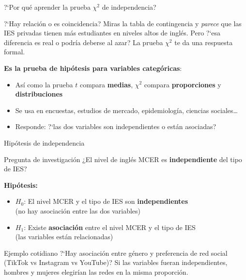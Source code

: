 \documentclass[aspectratio=169, 11pt]{beamer}
\begin{document}
\begin{frame}{?`Por qu\'e aprender la prueba $\chi^2$ de independencia?}
\small
\begin{exampleblock}{?`Hay relaci\'on o es coincidencia?}
Miras la tabla de contingencia y \textit{parece} que las IES privadas tienen m\'as estudiantes en niveles altos de ingl\'es. Pero ?`esa diferencia es real o podr\'ia deberse al azar? La prueba $\chi^2$ te da una respuesta formal.
\end{exampleblock}

\vspace{0.2cm}
\textbf{Es la prueba de hip\'otesis para variables categ\'oricas}:
\begin{itemize}\setlength{\itemsep}{1pt}
  \item As\'i como la prueba $t$ compara \textbf{medias}, $\chi^2$ compara \textbf{proporciones} y \textbf{distribuciones}
  \item Se usa en encuestas, estudios de mercado, epidemiolog\'ia, ciencias sociales\ldots
  \item Responde: ?`las dos variables son \alert{independientes} o est\'an \alert{asociadas}?
\end{itemize}
\end{frame}

\begin{frame}{Hipótesis de independencia}
\begin{block}{Pregunta de investigación}
¿El nivel de inglés MCER es \textbf{independiente} del tipo de IES?
\end{block}

\vspace{0.3cm}
\textbf{Hipótesis:}
\begin{itemize}
  \item $H_0$: El nivel MCER y el tipo de IES son \textbf{independientes}\\
        (no hay asociación entre las dos variables)
  \item $H_1$: Existe \textbf{asociación} entre el nivel MCER y el tipo de IES\\
        (las variables están relacionadas)
\end{itemize}

\vspace{0.3cm}
\begin{exampleblock}{Ejemplo cotidiano}
?`Hay asociaci\'on entre g\'enero y preferencia de red social (TikTok vs Instagram vs YouTube)? Si las variables fueran independientes, hombres y mujeres elegir\'ian las redes en la misma proporci\'on.
\end{exampleblock}
\end{frame}
\end{document}

